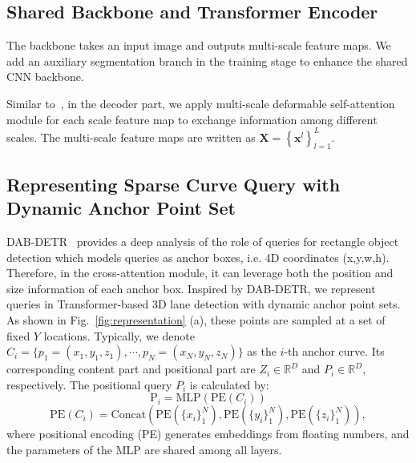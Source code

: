 \documentclass[letterpaper, 10 pt, conference]{ieeeconf}
\newcommand{\bX}{\mathbf{X}}
\newcommand{\bx}{\mathbf{x}}
\begin{document}
\subsection{Shared Backbone and Transformer Encoder}
The backbone takes an input image and outputs multi-scale feature maps. We add an auxiliary segmentation branch in the training stage to enhance the shared CNN backbone.

Similar to~\cite{zhu2020deformable}, in the decoder part, we apply multi-scale deformable self-attention module for each scale feature map to exchange information among different scales. The multi-scale feature maps are written as $\bX = \left\{\bx^l\right\}_{l=1}^L$.

\subsection{Representing Sparse Curve Query with Dynamic Anchor Point Set}

DAB-DETR~\cite{liu2022dab} provides a deep analysis of the role of queries for rectangle object detection which models queries as anchor boxes, i.e. 4D coordinates (x,y,w,h). Therefore, in the cross-attention module, it can leverage both the position and size information of each anchor box. Inspired by DAB-DETR, we represent queries in Transformer-based 3D lane detection with dynamic anchor point sets. As shown in Fig.~\ref{fig:representation} (a), these points are sampled at a set of fixed $Y$ locations. Typically, we denote $C_i = \{p_1=(x_1,y_1,z_1), \cdots, p_N=(x_N, y_N, z_N)\}$ as the $i$-th anchor curve.
Its corresponding content part and positional part are $Z_i \in \mathbb{R}^D$ and $P_i \in \mathbb{R}^D$, respectively. The positional query $P_i$ is calculated by:
\begin{equation}
    \text{P}_i = \text{MLP}(\text{PE}(C_i))
\label{P_i}
\end{equation}
\begin{equation}
    \text{PE}(C_i) = \text{Concat}(\text{PE}(\{x_i\}_1^N), \text{PE}(\{y_i\}_1^N), \text{PE}(\{z_i\}_1^N)),
\label{P_i}
\end{equation}
where positional encoding (PE) generates embeddings from floating numbers, and the parameters of the MLP are shared among all layers. 
\end{document}
